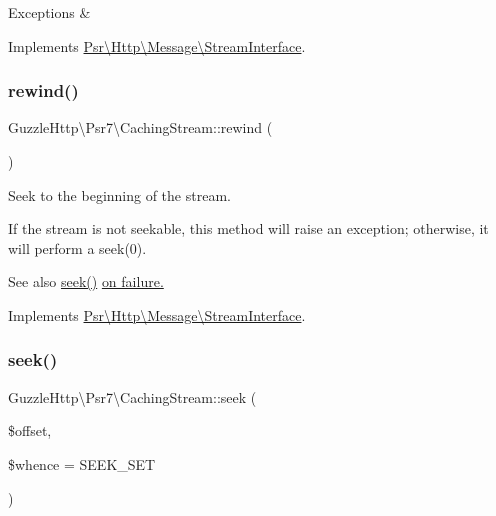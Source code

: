 \begin{DoxyExceptions}{Exceptions}
{\em } & \\
\hline
\end{DoxyExceptions}


Implements \hyperlink{interfacePsr_1_1Http_1_1Message_1_1StreamInterface_ad41b4afe827e179dfb4b988e98cccb12}{Psr\textbackslash{}\+Http\textbackslash{}\+Message\textbackslash{}\+Stream\+Interface}.

\mbox{\label{classGuzzleHttp_1_1Psr7_1_1CachingStream_ab893b58302d56d6946ca7355b5816ae4}} 
\subsubsection{\texorpdfstring{rewind()}{rewind()}}
{\footnotesize\ttfamily Guzzle\+Http\textbackslash{}\+Psr7\textbackslash{}\+Caching\+Stream\+::rewind (\begin{DoxyParamCaption}{ }\end{DoxyParamCaption})}

Seek to the beginning of the stream.

If the stream is not seekable, this method will raise an exception; otherwise, it will perform a seek(0).

\begin{DoxySeeAlso}{See also}
\hyperlink{classGuzzleHttp_1_1Psr7_1_1CachingStream_a6ae3ecc8a3a8073639793e81431a4a83}{seek()} \hyperlink{}{on failure. }
\end{DoxySeeAlso}


Implements \hyperlink{interfacePsr_1_1Http_1_1Message_1_1StreamInterface_a48721ef4d5097250a3f94515938393c9}{Psr\textbackslash{}\+Http\textbackslash{}\+Message\textbackslash{}\+Stream\+Interface}.

\mbox{\label{classGuzzleHttp_1_1Psr7_1_1CachingStream_a6ae3ecc8a3a8073639793e81431a4a83}} 
\subsubsection{\texorpdfstring{seek()}{seek()}}
{\footnotesize\ttfamily Guzzle\+Http\textbackslash{}\+Psr7\textbackslash{}\+Caching\+Stream\+::seek (\begin{DoxyParamCaption}\item[{}]{\$offset,  }\item[{}]{\$whence = {\ttfamily SEEK\+\_\+SET} }\end{DoxyParamCaption})}

